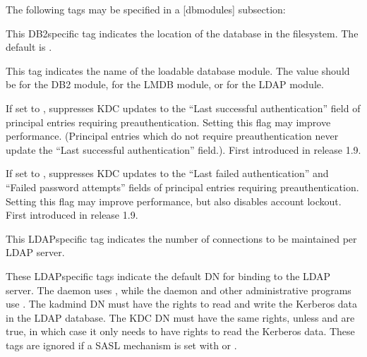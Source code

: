 \documentclass[letterpaper,10pt,english]{sphinxmanual}
\begin{document}
\sphinxAtStartPar
The following tags may be specified in a {[}dbmodules{]} subsection:
\begin{description}
\sphinxAtStartPar
This DB2\sphinxhyphen{}specific tag indicates the location of the database in
the filesystem.  The default is {\hyperref[\detokenize{mitK5defaults:paths}]{}}.

\sphinxAtStartPar
This tag indicates the name of the loadable database module.  The
value should be  for the DB2 module,  for the LMDB
module, or  for the LDAP module.

\sphinxAtStartPar
If set to , suppresses KDC updates to the “Last successful
authentication” field of principal entries requiring
preauthentication.  Setting this flag may improve performance.
(Principal entries which do not require preauthentication never
update the “Last successful authentication” field.).  First
introduced in release 1.9.

\sphinxAtStartPar
If set to , suppresses KDC updates to the “Last failed
authentication” and “Failed password attempts” fields of principal
entries requiring preauthentication.  Setting this flag may
improve performance, but also disables account lockout.  First
introduced in release 1.9.

\sphinxAtStartPar
This LDAP\sphinxhyphen{}specific tag indicates the number of connections to be
maintained per LDAP server.

\sphinxAtStartPar
These LDAP\sphinxhyphen{}specific tags indicate the default DN for binding to
the LDAP server.  The {\hyperref[\detokenize{admin/admin_commands/krb5kdc:krb5kdc-8}]{}} daemon uses
, while the {\hyperref[\detokenize{admin/admin_commands/kadmind:kadmind-8}]{}} daemon and other
administrative programs use .  The kadmind DN
must have the rights to read and write the Kerberos data in the
LDAP database.  The KDC DN must have the same rights, unless
 and  are true, in
which case it only needs to have rights to read the Kerberos data.
These tags are ignored if a SASL mechanism is set with
 or .


\end{description}
\end{document}
